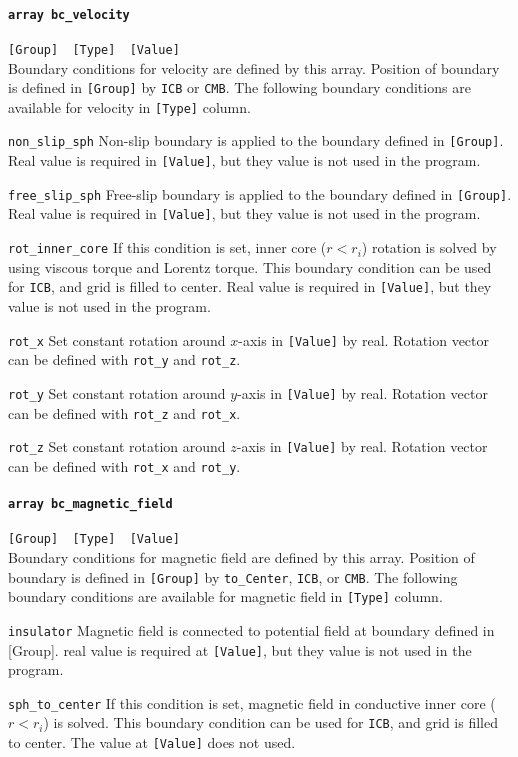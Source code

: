 \paragraph{\tt array bc\_velocity}
\label{href_t:bc_velocity}
\verb|[Group]  [Type]  [Value]| \\
Boundary conditions for velocity are defined by this array. Position of boundary is defined in \verb|[Group]| by {\tt ICB} or {\tt CMB}. The following boundary conditions are available for velocity in \verb|[Type]| column.
%
\begin{description}
\item{\tt non\_slip\_sph}	Non-slip boundary is applied to the boundary defined in \verb|[Group]|. Real value is required in \verb|[Value]|, but they value is not used in the program.
\item{\tt free\_slip\_sph}	Free-slip boundary is applied to the boundary defined in \verb|[Group]|. Real value is required in \verb|[Value]|, but they value is not used in the program.
\item{\tt rot\_inner\_core} If this condition is set, inner core ($r < r_{i}$) rotation is solved by using viscous torque and Lorentz torque. This boundary condition can be used for {\tt ICB}, and grid is filled to center. Real value is required in \verb|[Value]|, but they value is not used in the program.

\item{\tt rot\_x} Set constant rotation around $x$-axis in \verb|[Value]| by real. Rotation vector can be defined with {\tt rot\_y} and {\tt rot\_z}.
\item{\tt rot\_y} Set constant rotation around $y$-axis in \verb|[Value]| by real. Rotation vector can be defined with {\tt rot\_z} and {\tt rot\_x}.
\item{\tt rot\_z} Set constant rotation around $z$-axis in \verb|[Value]| by real. Rotation vector can be defined with {\tt rot\_x} and {\tt rot\_y}.
\end{description}
%

\paragraph{\tt array bc\_magnetic\_field}
\label{href_t:bc_magnetic_field}
\verb|[Group]  [Type]  [Value]| \\
Boundary conditions for magnetic field are defined by this array. Position of boundary is defined in \verb|[Group]| by {\tt to\_Center}, {\tt ICB}, or {\tt CMB}. The following boundary conditions are available for magnetic field in \verb|[Type]| column.
%
\begin{description}
\item{\tt insulator}	Magnetic field is connected to potential field at boundary defined in [Group]. real value is required at \verb|[Value]|, but they value is not used in the program.
\item{\tt sph\_to\_center}	 If this condition is set, magnetic field in conductive inner core ($r < r_{i}$) is solved. This boundary condition can be used for {\tt ICB}, and grid is filled to center. The value at \verb|[Value]| does not used.
\end{description}
%

